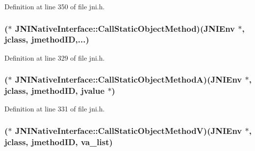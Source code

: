 Definition at line 350 of file jni.\-h.

\hypertarget{struct_j_n_i_native_interface_a7736e725a7675a302fcbeb6295d5b11a}{
\subsubsection[{Call\-Static\-Object\-Method}]{($\ast$ J\-N\-I\-Native\-Interface\-::\-Call\-Static\-Object\-Method)({\bf J\-N\-I\-Env} $\ast$, {\bf jclass}, {\bf jmethod\-I\-D},...)}}\label{struct_j_n_i_native_interface_a7736e725a7675a302fcbeb6295d5b11a}


Definition at line 329 of file jni.\-h.

\hypertarget{struct_j_n_i_native_interface_a56f8c4e36aca3a58154110e23d674191}{
\subsubsection[{Call\-Static\-Object\-Method\-A}]{($\ast$ J\-N\-I\-Native\-Interface\-::\-Call\-Static\-Object\-Method\-A)({\bf J\-N\-I\-Env} $\ast$, {\bf jclass}, {\bf jmethod\-I\-D}, {\bf jvalue} $\ast$)}}\label{struct_j_n_i_native_interface_a56f8c4e36aca3a58154110e23d674191}


Definition at line 331 of file jni.\-h.

\hypertarget{struct_j_n_i_native_interface_ac84ec114958c0a6a60a0c633bc1d5666}{
\subsubsection[{Call\-Static\-Object\-Method\-V}]{($\ast$ J\-N\-I\-Native\-Interface\-::\-Call\-Static\-Object\-Method\-V)({\bf J\-N\-I\-Env} $\ast$, {\bf jclass}, {\bf jmethod\-I\-D}, va\-\_\-list)}}\label{struct_j_n_i_native_interface_ac84ec114958c0a6a60a0c633bc1d5666}


